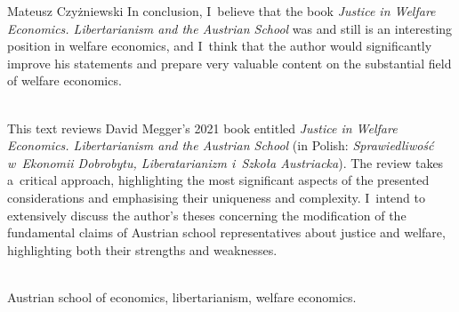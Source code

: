 \begin{newrevengenv}{Mateusz Czyżniewski}
In conclusion, I~believe that the book \textit{Justice in Welfare Economics. Libertarianism and the Austrian School} was and still is an interesting position in welfare economics, and I~think that the author would significantly improve his statements and prepare very valuable content on the substantial field of welfare economics.



\vspace{15mm}%
{}\\
{This text reviews David Megger's 2021 book entitled \textit{Justice in Welfare Economics. Libertarianism and the Austrian School} (in Polish: \textit{Sprawiedliwość w~Ekonomii Dobrobytu, Liberatarianizm i~Szkoła Austriacka}). The review takes a~critical approach, highlighting the most significant aspects of the presented considerations and emphasising their uniqueness and complexity. I~intend to extensively discuss the author's theses concerning the modification of the fundamental claims of Austrian school representatives about justice and welfare, highlighting both their strengths and weaknesses.}\par%
\vspace{2mm}%
{}\\
{Austrian school of economics, libertarianism, welfare economics.
}%



\end{newrevengenv}

\label{czyz-last}